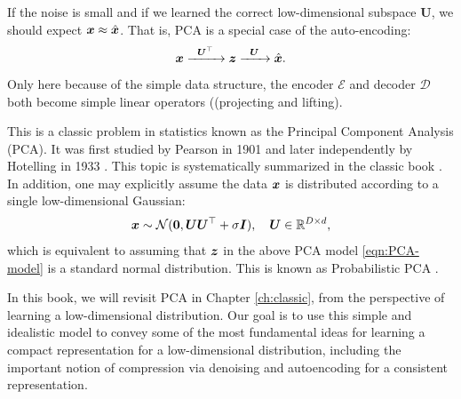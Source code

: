\documentclass[../../book-main.tex]{subfiles}
\begin{document}
If the noise is small and if we learned the correct low-dimensional subspace $\boldsymbol{U}$, we should expect $\bm{x} \approx \hat {\bm{x}}$. That is, PCA is a special case of the auto-encoding:
\begin{equation}
    \bm{x}   \xrightarrow{\hspace{2mm} \boldsymbol{U}^\top\hspace{2mm}} \bm{z}  \xrightarrow{\hspace{2mm} \boldsymbol{U} \hspace{2mm}} \hat {\bm{x}}.
       \label{eqn:auto-encoding-PCA}
\end{equation}
Only here because of the simple data structure, the encoder $\mathcal{E}$ and decoder $\mathcal{D}$ both become simple linear operators ((projecting and lifting).

This is a classic problem in statistics known as the Principal Component Analysis (PCA). It was first studied by Pearson in 1901 \cite{Pearson1901} and later independently by Hotelling in 1933 \cite{Hotelling1933}. This topic is systematically summarized in the classic book \cite{Jolliffe1986,JolliffeI2002}.
In addition, one may explicitly assume the data $\bm{x}$ is distributed according to a single low-dimensional Gaussian:
\begin{equation}
    \bm{x} \sim \mathcal{N}(\boldsymbol{0}, \boldsymbol{U}\boldsymbol{U}^\top + \sigma \bm{I}), \quad \boldsymbol{U} \in \mathbb{R}^{D\times d},
\end{equation}
which is equivalent to assuming that  $\bm{z}$ in the above PCA model \eqref{eqn:PCA-model} is a standard normal distribution. 
This is known as Probabilistic PCA \cite{TippingM1999}. 

In this book, we will revisit  PCA in Chapter \ref{ch:classic}, from the perspective of learning a low-dimensional distribution. Our goal is to use this simple and idealistic model to convey some of the most fundamental ideas for learning a compact representation for a low-dimensional distribution, including the important notion of compression via denoising and autoencoding for a consistent representation.
\end{document}
